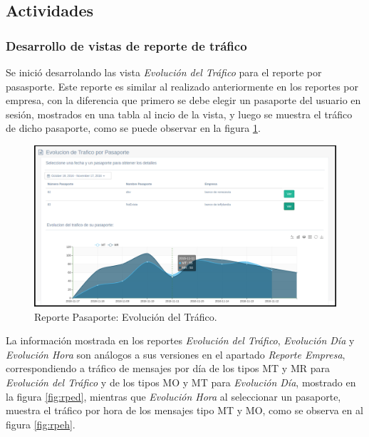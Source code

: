 \subsection{Actividades}

\subsubsection{Desarrollo de vistas de reporte de tráfico}
\indent Se inició desarrolando las vista \textit{Evolución del Tráfico} para el reporte por pasasporte. Este reporte es similar al realizado anteriormente en los reportes por empresa, con la diferencia que primero se debe elegir un pasaporte del usuario en sesión, mostrados en una tabla al incio de la vista, y luego se muestra el tráfico de dicho pasaporte, como se puede observar en la figura \ref{fig:rpet}.
\pagebreak
\begin{figure}[ht]
  \centering
  \includegraphics[scale=0.30,type=png,ext=.png,read=.png]{imagenes/rpet}
  \caption{Reporte Pasaporte: Evolución del Tráfico.}
  \label{fig:rpet}
\end{figure}

\indent La información mostrada en los reportes \textit{Evolución del Tráfico}, \textit{Evolución Día} y \textit{Evolución Hora} son análogos a sus versiones en el apartado \textit{Reporte Empresa}, correspondiendo a tráfico de mensajes por día de los tipos MT y MR para \textit{Evolución del Tráfico} y de los tipos MO y MT para \textit{Evolución Día}, mostrado en la figura \ref{fig:rped}, mientras que \textit{Evolución Hora} al seleccionar un pasaporte, muestra el tráfico por hora de los mensajes tipo MT y MO, como se observa en al figura \ref{fig:rpeh}.

